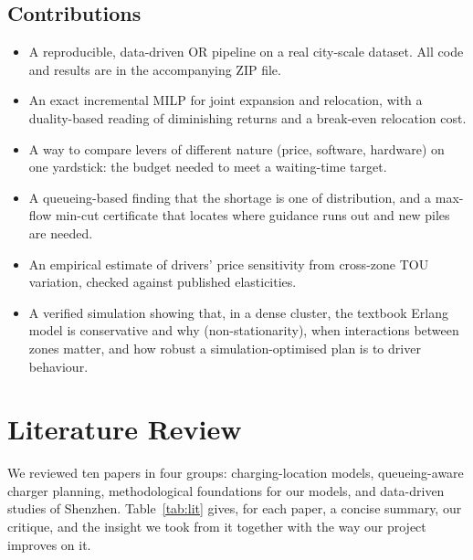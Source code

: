 \documentclass[11pt,a4paper]{article}
\begin{document}
\subsection{Contributions}
\begin{itemize}[leftmargin=1.3em,itemsep=1pt]
\item A reproducible, data-driven OR pipeline on a real city-scale dataset. All code and results are in the accompanying ZIP file.
\item An exact incremental MILP for joint expansion and relocation, with a duality-based reading of diminishing returns and a break-even relocation cost.
\item A way to compare levers of different nature (price, software, hardware) on one yardstick: the budget needed to meet a waiting-time target.
\item A queueing-based finding that the shortage is one of distribution, and a max-flow min-cut certificate that locates where guidance runs out and new piles are needed.
\item An empirical estimate of drivers' price sensitivity from cross-zone TOU variation, checked against published elasticities.
\item A verified simulation showing that, in a dense cluster, the textbook Erlang model is conservative and why (non-stationarity), when interactions between zones matter, and how robust a simulation-optimised plan is to driver behaviour.
\end{itemize}

\section{Literature Review}\label{sec:lit}
We reviewed ten papers in four groups: charging-location models, queueing-aware charger planning, methodological foundations for our models, and data-driven studies of Shenzhen. Table~\ref{tab:lit} gives, for each paper, a concise summary, our critique, and the insight we took from it together with the way our project improves on it.
\end{document}
